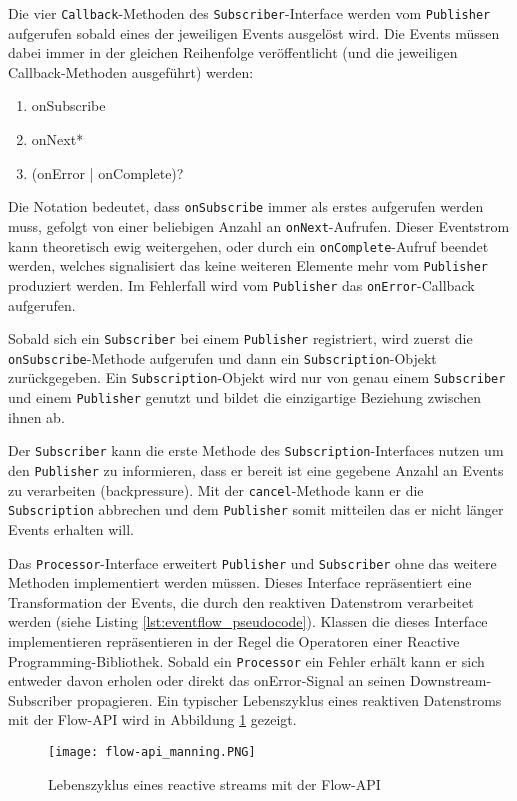 Die vier \verb|Callback|-Methoden des \verb|Subscriber|-Interface werden vom \verb|Publisher| aufgerufen sobald eines der jeweiligen Events ausgelöst wird.
Die Events müssen dabei immer in der gleichen Reihenfolge veröffentlicht (und die jeweiligen Callback-Methoden ausgeführt) werden:
\begin{enumerate}
    \item onSubscribe
    \item onNext*
    \item (onError | onComplete)?
\end{enumerate}
Die Notation bedeutet, dass \verb|onSubscribe| immer als erstes aufgerufen werden muss, gefolgt von einer beliebigen Anzahl an
\verb|onNext|-Aufrufen. Dieser Eventstrom kann theoretisch ewig weitergehen, oder durch ein \verb|onComplete|-Aufruf beendet werden, welches
signalisiert das keine weiteren Elemente mehr vom \verb|Publisher| produziert werden.
Im Fehlerfall wird vom \verb|Publisher| das \verb|onError|-Callback aufgerufen.

Sobald sich ein \verb|Subscriber| bei einem \verb|Publisher| registriert, wird zuerst die \verb|onSubscribe|-Methode aufgerufen und dann ein
\verb|Subscription|-Objekt zurückgegeben. Ein \verb|Subscription|-Objekt wird nur von genau einem \verb|Subscriber| und einem \verb|Publisher| genutzt
und bildet die einzigartige Beziehung zwischen ihnen ab.

Der \verb|Subscriber| kann die erste Methode des \verb|Subscription|-Interfaces nutzen um den \verb|Publisher| zu informieren, dass er bereit
ist eine gegebene Anzahl an Events zu verarbeiten (backpressure). Mit der \verb|cancel|-Methode kann er die \verb|Subscription| abbrechen und dem \verb|Publisher|
somit mitteilen das er nicht länger Events erhalten will.
\parencite{JavaSEFlow}

Das \verb|Processor|-Interface erweitert \verb|Publisher| und \verb|Subscriber| ohne das weitere Methoden implementiert werden müssen.
Dieses Interface repräsentiert eine Transformation der Events, die durch den
reaktiven Datenstrom verarbeitet werden (siehe Listing \ref{lst:eventflow_pseudocode}).
Klassen die dieses Interface implementieren repräsentieren in der Regel die Operatoren einer Reactive Programming-Bibliothek.
Sobald ein \verb|Processor| ein Fehler erhält kann er sich entweder davon erholen oder direkt das onError-Signal an seinen
Downstream-Subscriber propagieren. Ein typischer Lebenszyklus eines reaktiven Datenstroms mit der Flow-API wird in
Abbildung \ref{fig:flow-api} gezeigt.
\begin{figure}[ht!]
    \centering
    \texttt{[image: flow-api\_manning.PNG]}
    \caption{Lebenszyklus eines reactive streams mit der Flow-API \parencite[Kapitel 17,  Figure 17.3]{JavaInAction}}
    \label{fig:flow-api}
\end{figure}
\newpage

